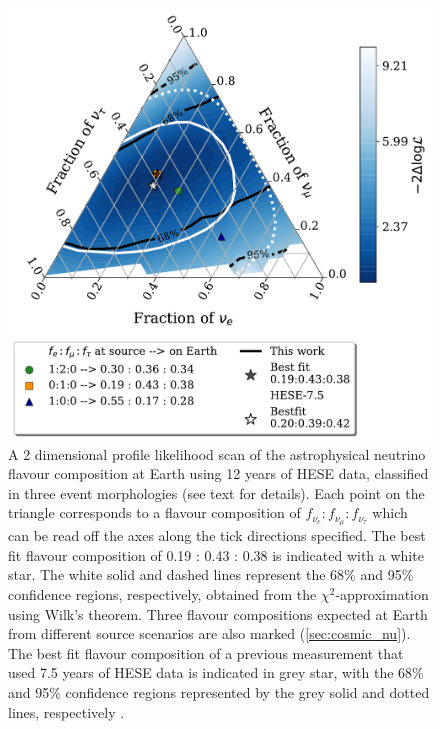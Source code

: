 \begin{figure}[h!]
    
    \includegraphics{./figures/results/HESE12_fancy_coverage_say_withhese7.pdf}
    \caption[Profile likelihood scan of the astrophysical neutrino flavor composition at Earth]{A 2 dimensional profile likelihood scan of the astrophysical neutrino flavour composition at Earth using 12 years of HESE data, classified in three event morphologies (see text for details). Each point on the triangle corresponds to a flavour composition of $f_{\nu_e}:f_{\nu_{\mu}}:f_{\nu_{\tau}}$ which can be read off the axes along the tick directions specified. The best fit flavour composition of 0.19 : 0.43 : 0.38 is indicated with a white star. The white solid and dashed lines represent the 68\% and 95\% confidence regions, respectively, obtained from the $\chi^2$-approximation using Wilk's theorem. Three flavour compositions expected at Earth from different source scenarios are also marked (\ref{sec:cosmic_nu}). The best fit flavour composition of a previous measurement that used 7.5 years of HESE data is indicated in grey star, with the 68\% and 95\% confidence regions represented by the grey solid and dotted lines, respectively \cite{Juliana_paper}.}

\end{figure}

